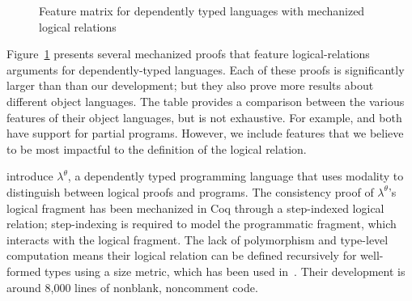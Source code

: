 \documentclass[\ifpublic nolinenum\else\fi,online,OA]{jfp}
\newcommand{\scw}[1]{}
\newcommand{\yl}[1]{}
\theoremstyle{definition}
\begin{document}
\begin{figure}[H]
  \caption{Feature matrix for dependently typed languages with
    mechanized logical relations}
  \label{fig:featurematrix}
\end{figure}
\scw{Extra columns in Fig 10:  Predicate vs. Relational interpretation (we can explain this) / Typed vs. Untyped interpretation}

\scw{Should we add a column for whether their logical relation is
  unary or binary?}\yl{Technically a Kripke-style model has the
  context as an argument to the logrel, too. By binary, we are really
  talking about whether the interpreted set is binary or not. I think
  it is tricky to explain what we actually mean. }
\scw{I don't think it is that trick}
Figure~\ref{fig:featurematrix} presents several mechanized proofs
that feature logical-relations arguments for dependently-typed languages.
Each of these proofs is significantly larger than than our development; but they
also prove more results about different object languages.%
The table provides a comparison between the various features of their
object languages, but is not exhaustive. For example,
\citet{casinghino:combining-proofs-programs} and
\citet{anand2014towards} both have support for partial
programs. However, we include features that we believe to be most
impactful to the definition of the logical relation.

\citet{casinghino:combining-proofs-programs} introduce $\lambda^\theta$, a dependently typed
programming language that uses modality to distinguish between logical
proofs and programs. %
The consistency proof of $\lambda^\theta$'s logical fragment has been
mechanized in Coq through a step-indexed logical relation;
step-indexing is required to model the programmatic fragment, which
interacts with the logical fragment.
The lack of polymorphism and type-level computation means their
logical relation can be defined recursively for well-formed types using
a size metric, which has been used in~\citet{liu2023dependently}.
Their development is around 8,000 lines of nonblank, noncomment code.
\end{document}
